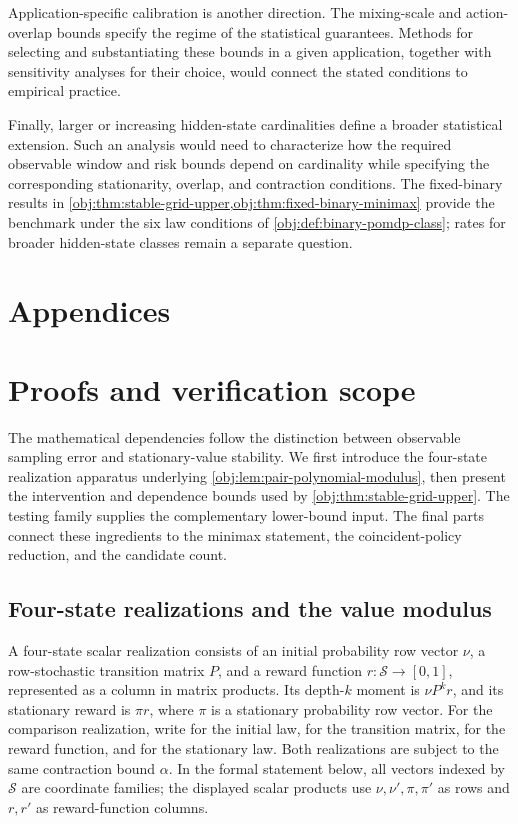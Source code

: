 \documentclass[11pt]{article}
\begin{document}
Application-specific calibration is another direction. The mixing-scale and action-overlap bounds specify the regime of the statistical guarantees. Methods for selecting and substantiating these bounds in a given application, together with sensitivity analyses for their choice, would connect the stated conditions to empirical practice.

Finally, larger or increasing hidden-state cardinalities define a broader statistical extension. Such an analysis would need to characterize how the required observable window and risk bounds depend on cardinality while specifying the corresponding stationarity, overlap, and contraction conditions. The fixed-binary results in \cref{obj:thm:stable-grid-upper,obj:thm:fixed-binary-minimax} provide the benchmark under the six law conditions of \cref{obj:def:binary-pomdp-class}; rates for broader hidden-state classes remain a separate question.


\appendix

\section*{Appendices}

\section{Proofs and verification scope}

The mathematical dependencies follow the distinction between observable sampling error and stationary-value stability. We first introduce the four-state realization apparatus underlying \cref{obj:lem:pair-polynomial-modulus}, then present the intervention and dependence bounds used by \cref{obj:thm:stable-grid-upper}. The testing family supplies the complementary lower-bound input. The final parts connect these ingredients to the minimax statement, the coincident-policy reduction, and the candidate count.

\subsection{Four-state realizations and the value modulus}

A four-state scalar realization consists of an initial probability row vector \(\nu\), a row-stochastic transition matrix \(P\), and a reward function \(r\colon\mathcal S\to[0,1]\), represented as a column in matrix products. Its depth-\(k\) moment is \(\nu P^k r\), and its stationary reward is \(\pi r\), where \(\pi\) is a stationary probability row vector. For the comparison realization, write  for the initial law,  for the transition matrix,  for the reward function, and  for the stationary law. Both realizations are subject to the same contraction bound \(\alpha\). In the formal statement below, all vectors indexed by \(\mathcal S\) are coordinate families; the displayed scalar products use \(\nu,\nu',\pi,\pi'\) as rows and \(r,r'\) as reward-function columns.
\end{document}

